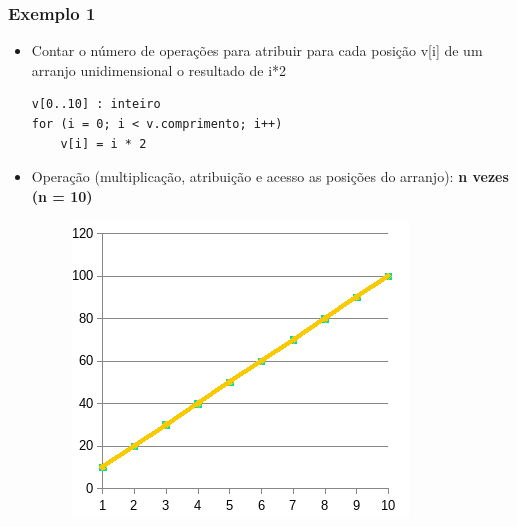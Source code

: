 \documentclass[aspectratio=169]{beamer}
\begin{document}
\begin{frame}[fragile]\frametitle{Exemplo 1}
\begin{itemize}
	\item Contar o número de operações para atribuir para cada posição v[i] de um arranjo unidimensional o resultado de i*2
\begin{verbatim}
v[0..10] : inteiro
for (i = 0; i < v.comprimento; i++)
    v[i] = i * 2
\end{verbatim}
	\pause
	\item Operação (multiplicação, atribuição e acesso as posições do arranjo): \textbf{n vezes (n = 10)}
	\pause
	\begin{figure}[h]
		\centering
		\includegraphics[height=0.4\paperheight]{pucrs-ec-poo-unidade_01-complexidade_de_algoritmos-laminas-grafico2.png}
	\end{figure}
\end{itemize}
\end{frame}
\end{document}
